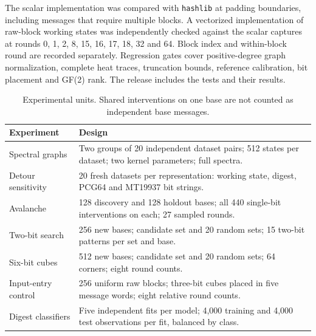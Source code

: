 \documentclass[11pt]{article}
\begin{document}
The scalar implementation was compared with \texttt{hashlib} at padding boundaries, including messages that require multiple blocks. A vectorized implementation of raw-block working states was independently checked against the scalar captures at rounds 0, 1, 2, 8, 15, 16, 17, 18, 32 and 64. Block index and within-block round are recorded separately. Regression gates cover positive-degree graph normalization, complete heat traces, truncation bounds, reference calibration, bit placement and GF(2) rank. The release includes the tests and their results.

\begin{table}[ht]
\centering\small
\caption{Experimental units. Shared interventions on one base are not counted as independent base messages.}
\begin{tabular}{@{}p{.25\linewidth}p{.66\linewidth}@{}}\toprule
Experiment & Design \\\midrule
Spectral graphs & Two groups of 20 independent dataset pairs; 512 states per dataset; two kernel parameters; full spectra. \\
Detour sensitivity & 20 fresh datasets per representation: working state, digest, PCG64 and MT19937 bit strings. \\
Avalanche & 128 discovery and 128 holdout bases; all 440 single-bit interventions on each; 27 sampled rounds. \\
Two-bit search & 256 new bases; candidate set and 20 random sets; 15 two-bit patterns per set and base. \\
Six-bit cubes & 512 new bases; candidate set and 20 random sets; 64 corners; eight round counts. \\
Input-entry control & 256 uniform raw blocks; three-bit cubes placed in five message words; eight relative round counts. \\
Digest classifiers & Five independent fits per model; 4,000 training and 4,000 test observations per fit, balanced by class. \\\bottomrule
\end{tabular}
\end{table}
\end{document}
